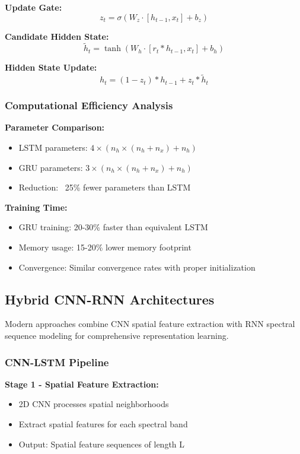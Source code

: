 \documentclass[journal]{IEEEtran}
\begin{document}
\textbf{Update Gate:}
\begin{equation}
z_t = \sigma(W_z \cdot [h_{t-1}, x_t] + b_z)
\end{equation}

\textbf{Candidate Hidden State:}
\begin{equation}
\tilde{h}_t = \tanh(W_h \cdot [r_t * h_{t-1}, x_t] + b_h)
\end{equation}

\textbf{Hidden State Update:}
\begin{equation}
h_t = (1 - z_t) * h_{t-1} + z_t * \tilde{h}_t
\end{equation}

\subsubsection{Computational Efficiency Analysis}

\textbf{Parameter Comparison:}
\begin{itemize}
\item LSTM parameters: $4 \times (n_h \times (n_h + n_x) + n_h)$
\item GRU parameters: $3 \times (n_h \times (n_h + n_x) + n_h)$
\item Reduction: ~25\% fewer parameters than LSTM
\end{itemize}

\textbf{Training Time:}
\begin{itemize}
\item GRU training: 20-30\% faster than equivalent LSTM
\item Memory usage: 15-20\% lower memory footprint
\item Convergence: Similar convergence rates with proper initialization
\end{itemize}

\subsection{Hybrid CNN-RNN Architectures}

Modern approaches combine CNN spatial feature extraction with RNN spectral sequence modeling for comprehensive representation learning.

\subsubsection{CNN-LSTM Pipeline}

\textbf{Stage 1 - Spatial Feature Extraction:}
\begin{itemize}
\item 2D CNN processes spatial neighborhoods
\item Extract spatial features for each spectral band
\item Output: Spatial feature sequences of length L
\end{itemize}
\end{document}
